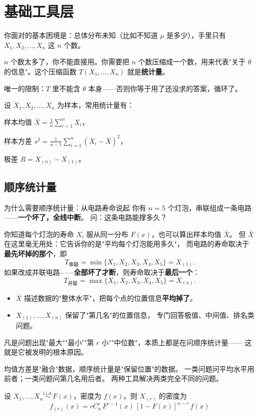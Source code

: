 \chapter{基础工具层}
\begin{note}[统计量是什么问题的答案]
你面对的基本困境是：总体分布未知（比如不知道 $\mu$ 是多少），手里只有 $X_1, X_2, \ldots, X_n$ 这 $n$ 个数。

$n$ 个数太多了，你不能直接用。你需要把 $n$ 个数压缩成一个数，用来代表"关于 $\theta$ 的信息"。这个压缩函数 $T(X_1,\ldots,X_n)$ 就是\textbf{统计量}。

唯一的限制：$T$ 里不能含 $\theta$ 本身——否则你等于用了还没求的答案，循环了。
\end{note}
\begin{definition}[常见统计量]
设 $X_1, X_2, \ldots, X_n$ 为样本，常用统计量有：

样本均值 $\displaystyle\bar{X} = \frac{1}{n}\sum_{i=1}^n X_i$，

样本方差 $\displaystyle s^2 = \frac{1}{n-1}\sum_{i=1}^n (X_i - \bar{X})^2$，

极差 $R = X_{(n)} - X_{(1)}$。
\end{definition}
\section{顺序统计量}

\begin{example}{为什么需要顺序统计量：从电路寿命说起}
你有 $n = 5$ 个灯泡，串联组成一条电路——\textbf{一个坏了，全线中断}。
问：这条电路能撑多久？

你知道每个灯泡的寿命 $X_i$ 服从同一分布 $F(x)$，也可以算出样本均值 $\bar{X}$。
但 $\bar{X}$ 在这里毫无用处：它告诉你的是"平均每个灯泡能用多久"，
而电路的寿命取决于\textbf{最先坏掉的那个}，即
\[
    T_{\text{串联}} = \min\{X_1, X_2, X_3, X_4, X_5\} = X_{(1)}.
\]
如果改成并联电路——\textbf{全部坏了才断}，则寿命取决于\textbf{最后一个}：
\[
    T_{\text{并联}} = \max\{X_1, X_2, X_3, X_4, X_5\} = X_{(n)}.
\]

\begin{itemize}
    \item $\bar{X}$ 描述数据的"整体水平"，把每个点的位置信息\textbf{平均掉了}。
    \item $X_{(1)}, \dots, X_{(n)}$ 保留了"第几名"的位置信息，
          专门回答极值、中间值、排名类问题。
\end{itemize}

凡是问题出现"最大""最小""第 $r$ 小""中位数"，本质上都是在问顺序统计量——
这就是它被发明的根本原因。
\end{example}
\begin{dxtips}
    均值方差是"融合"数据，顺序统计量是"保留位置"的数据。
    一类问题问平均水平用前者；一类问题问第几名用后者。
    两种工具解决两类完全不同的问题。
\end{dxtips}
\begin{theorem}[第 $r$ 个顺序统计量的密度]
设 $X_1, \ldots, X_n \overset{\text{i.i.d.}}{\sim} F(x)$，密度为 $f(x)$，则 $X_{(r)}$ 的密度为
$$f_{(r)}(x) = r C_n^r\, F^{r-1}(x)\,[1-F(x)]^{n-r}\,f(x)$$
\end{theorem}

